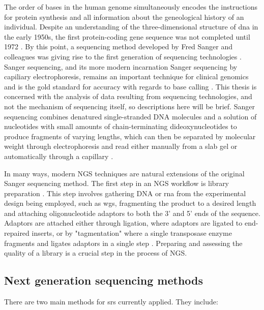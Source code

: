 The order of bases in the human genome simultaneously encodes the instructions for protein synthesis and all information about the geneological history of an individual. Despite an understanding of the three-dimensional structure of \gls{dna} in the early 1950s, the first protein-coding gene sequence was not completed until 1972 \cite{JD1953,JOU1972}. By this point, a sequencing method developed by Fred Sanger and colleagues was giving rise to the first generation of sequencing technologies \cite{Kulkarni2014}. Sanger sequencing, and its more modern incarnation Sanger sequencing by capiliary electrophoresis, remains an important technique for clinical genomics and is the gold standard for accuracy with regards to base calling \cite{Shendure2017}. This thesis is concerned with the analysis of data resulting from sequencing technologies, and not the mechanism of sequencing itself, so descriptions here will be brief. Sanger sequencing combines denatured single-stranded DNA molecules and a solution of nucleotides with small amounts of chain-terminating dideoxynucleotides to produce fragments of varying lengths, which can then be separated by molecular weight through electrophoresis and read either manually from a slab gel or automatically through a capillary \cite{F1977,Liu2012}. 

In many ways, modern NGS techniques are natural extensions of the original Sanger sequencing method. The first step in an NGS workflow is library preparation \cite{Head2018}. This step involves gathering DNA or \gls{rna} from the experimental design being employed, such as \gls{wgs}, fragmenting the product to a desired length and attaching oligonucleotide adaptors to both the 3' and 5' ends of the sequence. Adaptors are attached either through ligation, where adaptors are ligated to end-repaired inserts, or by "tagmentation" where a single transposase enzyme fragments and ligates adaptors in a single step \cite{R2011}. Preparing and assessing the quality of a library is a crucial step in the process of NGS. 

\subsection{Next generation sequencing methods} \label{intro:ngs_methods}

There are two main methods for \gls{srs} currently applied. They include:

